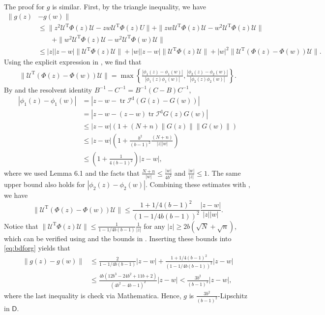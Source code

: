 \documentclass[reqno]{amsart}
\DeclareMathOperator{\tr}{tr}
\newcommand{\T}{\mathrm{T}}
\theoremstyle{plain}
\theoremstyle{definition}
\begin{document}
The proof for $g$ is similar. First, by the triangle inequality, we have 
\begin{align}\label{eq:bdforg}
	\| g(z)& - g(w) \| \nonumber\\
	&\leq \|z^2 \mathcal U^\T \Phi(z) \mathcal U - zw \mathcal U^\T \Phi (z) U \| + \| zw \mathcal U^\T \Phi(z) \mathcal U - w^2 \mathcal U^\T \Phi(z) \mathcal U \| \nonumber\\
	&\qquad + \| w^2 \mathcal U^\T \Phi(z) \mathcal U - w^2 \mathcal U^\T \Phi(w) \mathcal U \| \nonumber \\
	&\leq |z||z - w| \|\mathcal U^\T \Phi(z) \mathcal U\|  + |w| |z-w| \|\mathcal U^\T \Phi(z) \mathcal U\| + |w|^2 \|\mathcal U^\T (\Phi(z)-\Phi(w)) \mathcal U \|.
\end{align}
Using the explicit expression in \cite[Eq. (29)]{Wang24}, we find that
\begin{align*}
\|\mathcal U^\T (\Phi(z)-\Phi(w)) \mathcal U \| = \max\left\{ \frac{|\phi_1(z)-\phi_1(w)|}{|\phi_1(z)\phi_1(w)|}, \frac{|\phi_2(z)-\phi_2(w)|}{|\phi_2(z)\phi_2(w)|} \right\}.
\end{align*}
By \cite[Eq. (27)]{Wang24} and the resolvent identity $B^{-1} - C^{-1} = B^{-1} (C - B) C^{-1} $, 
\begin{align*}
|\phi_1(z)-\phi_1(w)| &= |z-w - \tr \mathcal I^\mathrm{d} (G(z)-G(w))|\\
&=|z-w - (z-w)\tr \mathcal I^\mathrm{d} G(z)G(w)| \\
&\le |z-w| \left( 1+ (N+n) \|G(z)\| \|G(w)\| \right)\\
&\le |z-w| \left( 1+ \frac{b^2}{(b-1)^2}\frac{(N+n) }{|z| |w|} \right) \\
&\le \left( 1+ \frac{1}{4(b-1)^2} \right)|z-w|,
\end{align*}
where we used Lemma 6.1 and the facts that $\frac{N+n}{|w|}\le \frac{|w|}{4b^2}$ and $\frac{|w|}{|z|} \leq 1$. The same upper bound also holds for $|\phi_2(z)-\phi_2(w)|$. Combining these estimates with \cite[Eq. (31)]{Wang24}, we have $$\|\mathcal U^\T (\Phi(z)-\Phi(w)) \mathcal U \| \le \frac{1+1/4(b-1)^2}{(1-1/4b(b-1))^2} \frac{|z-w|}{|z| |w|}.$$
Notice that 
$\|\mathcal U^\T \Phi(z) \mathcal U\| \le \frac{1}{1-1/4b(b-1)}\frac{1}{|z|}$ for any $|z| \ge 2b(\sqrt N + \sqrt n)$, which can be verified using \cite[Eq. (30)]{Wang24} and the bounds in \cite[Eq. (31)]{Wang24}. Inserting these bounds into \eqref{eq:bdforg} yields that 
\begin{align*}
\| g(z) - g(w) \| &\le \frac{2}{1-1/4b(b-1)}|z-w|+\frac{1+1/4(b-1)^2}{(1-1/4b(b-1))^2} |z-w|\\
&\le \frac{4b(12b^3 - 24 b^2 +11 b +2)}{(4b^2-4b-1)^2}|z-w|< \frac{3b^2}{(b-1)^2} |z-w|,
\end{align*}
where the last inequality is check via Mathematica. Hence, $g$ is $\frac{3b^2}{(b-1)^2}$-Lipschitz in $\mathsf D$. 
\end{document}
